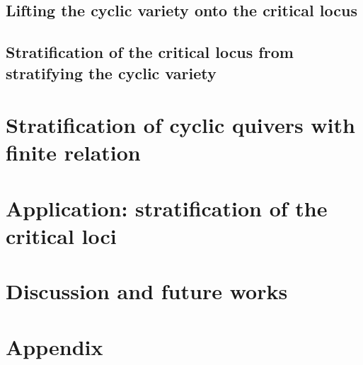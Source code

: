 \documentclass{article}
\theoremstyle{definition}
\begin{document}
\subsection{Lifting the cyclic variety onto the critical locus}

\subsection{Stratification of the critical locus from stratifying the cyclic variety}

\section{Stratification of cyclic quivers with finite relation}

\section{Application: stratification of the critical loci}

\section{Discussion and future works}



\section*{Appendix}
\end{document}
